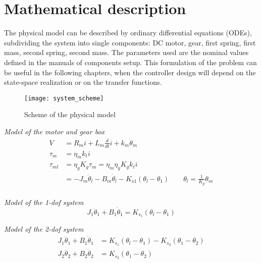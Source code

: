 \section{Mathematical description}

The physical model can be described by ordinary differential equations (ODEs), subdividing the system into single components: DC motor, gear, first spring, first mass, second spring, second mass. The parameters used are the nominal values defined in the manuals of components setup. This formulation of the problem can be useful in the following chapters, when the controller design will depend on the state-space realization or on the transfer functions.
\begin{figure*}[h]
	\centering
	\texttt{[image: system\_scheme]}
	\caption{Scheme of the physical model}
\end{figure*}

\textit{Model of the motor and gear box}
\begin{subequations}
	\begin{align}
		V &= R_m i + L_m \frac{d}{dt}i + k_m \dot{\theta}_m \\
		\tau_m &= \eta_m k_t i \\
		\tau_{ml} &= \eta_g K_g \tau_m = \eta_m \eta_g K_g k_t i\\
		&= -J_m \ddot{\theta}_l - B_m \dot{\theta}_l - K_{s1} ( \theta_l - \theta_1 ) \qquad  \theta_l = \frac {1}{K_g} \theta_m \\
		\label{fig:model_equations}
	\end{align}
\end{subequations}

\textit{Model of the \acrshort{1-dof} system}
\begin{equation}
	J_1 \ddot{\theta}_1 + B_1 \dot{\theta}_1 = K_{s_1} ( \theta_l - \theta_1 )
\end{equation}

\textit{Model of the \acrshort{2-dof} system}
\begin{subequations}
	\begin{align}
		J_1 \ddot{\theta}_1 + B_1 \dot{\theta}_1 &= K_{s_1} ( \theta_l - \theta_1 ) - K_{s_2} ( \theta_1 - \theta_2 ) \\
		J_2 \ddot{\theta}_2 + B_2 \dot{\theta}_2 &= K_{s_2} ( \theta_1 - \theta_2 )
	\end{align}
\end{subequations}


